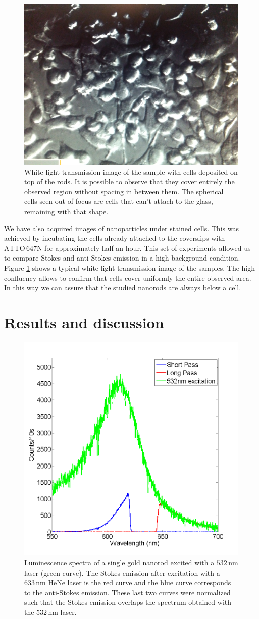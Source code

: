 \documentclass[journal=nalefd,manuscript=letter]{achemso}
\newcommand{\nm}{\ensuremath{\,\textrm{nm}}}
\newcommand{\atto}{\ensuremath{\textrm{ATTO}\,647\textrm{N}}}
\begin{document}
\begin{figure}[htp]
\centering
	\includegraphics[width=0.4\linewidth]{Figures/02_White_Light/White_Light_with_phone.jpg}
	\caption{White light transmission image of the sample with cells deposited on
	top of the rods. It is possible to observe that they cover entirely the
	observed region without spacing in between them. The spherical cells seen out
	of focus are cells that can't attach to the glass, remaining with that shape.}
	\label{fig:white-light}
\end{figure}

We have also acquired images of nanoparticles under stained cells. This was
achieved by incubating the cells already attached to the coverslips with $\atto$
for approximately half an hour. This set of experiments allowed us to compare
Stokes and anti-Stokes emission in a high-background condition. Figure
\ref{fig:white-light} shows a typical white light transmission image of the
samples. The high confluency allows to confirm that cells cover uniformly the
entire observed area. In this way we can assure that the studied nanorods are
always below a cell.


\section{Results and discussion}

\begin{figure}[htp]
\centering
	\includegraphics[width=0.4\linewidth]{3_Curves.png}
	\caption{Luminescence spectra of a single gold nanorod excited with a $532\nm$
	laser (green curve). The Stokes emission after excitation with a $633\nm$
	HeNe laser is the red curve and the blue curve corresponds to the anti-Stokes
	emission. These last two curves were normalized such that the Stokes emission
	overlaps the spectrum obtained with the $532\nm$ laser.}
	\label{fig:spectra_rod}
\end{figure}
\end{document}
